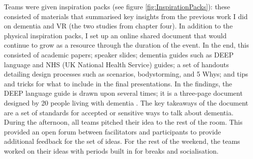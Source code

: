 Teams were given inspiration packs (see figure \ref{fig:InspirationPacks}): these consisted of materials that summarised key insights from the previous work I did on dementia and VR (the two studies from chapter four). In addition to the physical inspiration packs, I set up an online shared document that would continue to grow as a resource through the duration of the event. In the end, this consisted of academic papers; speaker slides; dementia guides such as DEEP language and NHS (UK National Health Service) guides; a set of handouts detailing design processes such as scenarios, bodystorming, and 5 Whys; and tips and tricks for what to include in the final presentations. In the findings, the DEEP language guide is drawn upon several times; it is a three-page document designed by 20 people living with dementia \citep{diaries_deep_2020}. The key takeaways of the document are a set of standards for accepted or sensitive ways to talk about dementia. During the afternoon, all teams pitched their idea to the rest of the room. This provided an open forum between facilitators and participants to provide additional feedback for the set of ideas. For the rest of the weekend, the teams worked on their ideas with periods built in for breaks and socialisation. 

